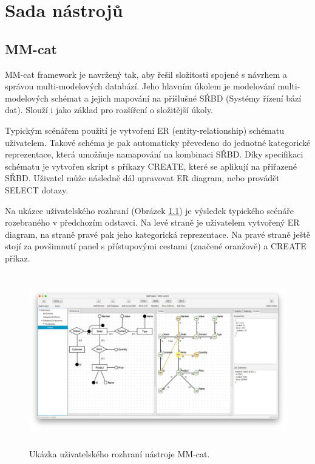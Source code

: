 \pagestyle{plain}  %

\chapter{Sada nástrojů}


\section{MM-cat}

MM-cat framework je navržený tak, aby řešil složitosti spojené s návrhem a správou multi-modelových databází. Jeho hlavním úkolem je modelování multi-modelových schémat a jejich mapování na příšlušné SŘBD (Systémy řízení bází dat). Slouží i jako základ pro rozšíření o složitější úkoly.

Typickým scénářem použití je vytvoření ER (entity-relationship) schématu uživatelem. Takové schéma je pak automaticky převedeno do jednotné kategorické reprezentace, která umožňuje namapování na kombinaci SŘBD. Díky specifikaci schématu je vytvořen skript s příkazy CREATE, které se aplikují na přiřazené SŘBD. Uživatel může následně dál upravovat ER diagram, nebo provádět SELECT dotazy.

Na ukázce uživatelského rozhraní (Obrázek \ref{obr01:mm-cat}) je výsledek typického scénáře rozebraného v předchozím odstavci. Na levé straně je uživatelem vytvořený ER diagram, na straně pravé pak jeho kategorická reprezentace. Na pravé straně ještě stojí za povšimnutí panel s přístupovými cestami (značené oranžově) a CREATE příkaz.

\begin{figure}[htb]
  \centering
  \includegraphics[height=75mm]{../img/mm-cat}
  \caption{Ukázka uživatelského rozhraní nástroje MM-cat.}
  \label{obr01:mm-cat}
\end{figure}

